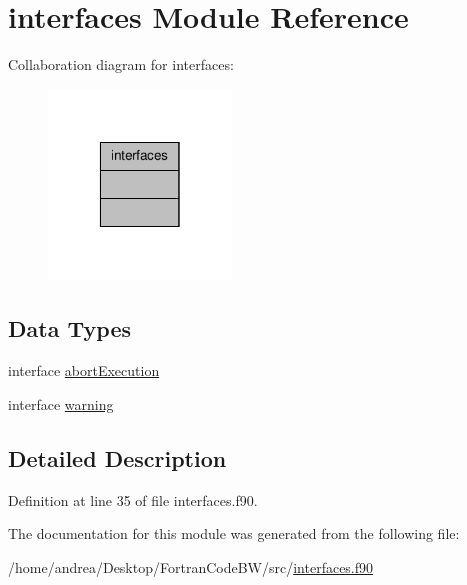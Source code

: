 \hypertarget{classinterfaces}{\section{interfaces Module Reference}
\label{classinterfaces}
}


Collaboration diagram for interfaces\-:\nopagebreak
\begin{figure}[H]
\begin{center}
\leavevmode
\includegraphics[width=138pt]{classinterfaces__coll__graph}
\end{center}
\end{figure}
\subsection*{Data Types}
\begin{DoxyCompactItemize}
\item 
interface \hyperlink{interfaceinterfaces_1_1abort_execution}{abort\-Execution}
\item 
interface \hyperlink{interfaceinterfaces_1_1warning}{warning}
\end{DoxyCompactItemize}


\subsection{Detailed Description}


Definition at line 35 of file interfaces.\-f90.



The documentation for this module was generated from the following file\-:\begin{DoxyCompactItemize}
\item 
/home/andrea/\-Desktop/\-Fortran\-Code\-B\-W/src/\hyperlink{interfaces_8f90}{interfaces.\-f90}\end{DoxyCompactItemize}
